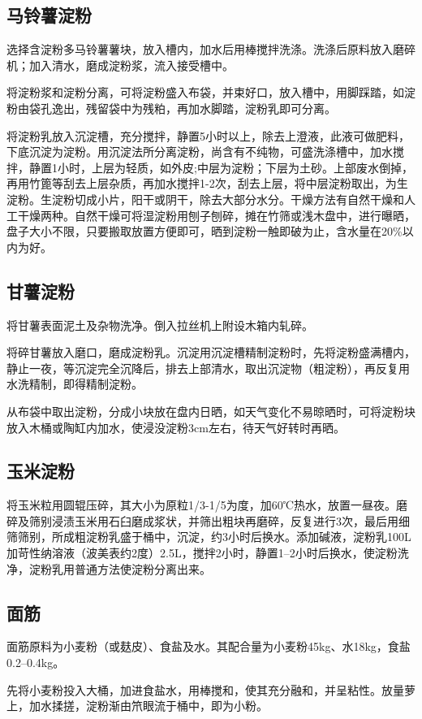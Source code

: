 \documentclass{ctexbook}
\begin{document}
\subsection{马铃薯淀粉}
选择含淀粉多马铃薯薯块，放入槽内，加水后用棒搅拌洗涤。洗涤后原料放入磨碎机；加入清水，磨成淀粉浆，流入接受槽中。

将淀粉浆和淀粉分离，可将淀粉盛入布袋，并束好口，放入槽中，用脚踩踏，如淀粉由袋孔逸出，残留袋中为残粕，再加水脚踏，淀粉乳即可分离。

将淀粉乳放入沉淀槽，充分搅拌，静置5小时以上，除去上澄液，此液可做肥料，下底沉淀为淀粉。用沉淀法所分离淀粉，尚含有不纯物，可盛洗涤槽中，加水搅拌，静置1小时，上层为轻质，如外皮;中层为淀粉；下层为土砂。上部废水倒掉，再用竹篦等刮去上层杂质，再加水搅拌1-2次，刮去上层，将中层淀粉取出，为生淀粉。生淀粉切成小片，阳干或阴干，除去大部分水分。干燥方法有自然干燥和人工干燥两种。自然干燥可将湿淀粉用刨子刨碎，摊在竹筛或浅木盘中，进行曝晒，盘子大小不限，只要搬取放置方便即可，晒到淀粉一触即破为止，含水量在20\%以内为好。
\subsection{甘薯淀粉}
将甘薯表面泥土及杂物洗净。倒入拉丝机上附设木箱内轧碎。

将碎甘薯放入磨口，磨成淀粉乳。沉淀用沉淀槽精制淀粉时，先将淀粉盛满槽内，静止一夜，等沉淀完全沉降后，排去上部清水，取出沉淀物（粗淀粉），再反复用水洗精制，即得精制淀粉。

从布袋中取出淀粉，分成小块放在盘内日晒，如天气变化不易晾晒时，可将淀粉块放入木桶或陶缸内加水，使浸没淀粉3cm左右，待天气好转时再晒。

\subsection{玉米淀粉}
将玉米粒用圆辊压碎，其大小为原粒1/3-1/5为度，加60℃热水，放置一昼夜。磨碎及筛别浸渍玉米用石臼磨成浆状，并筛出粗块再磨碎，反复进行3次，最后用细筛筛别，所成粗淀粉乳盛于桶中，沉淀，约3小时后换水。添加碱液，淀粉乳100L加苛性纳溶液（波美表约2度）2.5L，搅拌2小时，静置1--2小时后换水，使淀粉洗净，淀粉乳用普通方法使淀粉分离出来。
\subsection{面筋}
面筋原料为小麦粉（或麸皮）、食盐及水。其配合量为小麦粉45kg、水18kg，食盐0.2--0.4kg。

先将小麦粉投入大桶，加进食盐水，用棒搅和，使其充分融和，并呈粘性。放量萝上，加水揉搓，淀粉渐由笊眼流于桶中，即为小粉。
\end{document}
